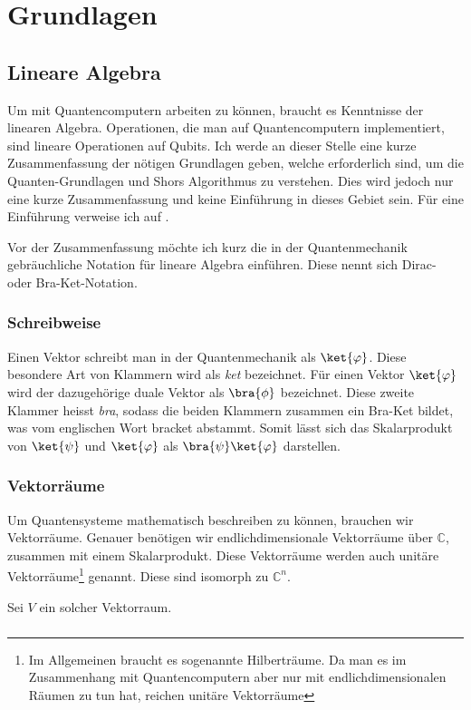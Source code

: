 \chapter{Grundlagen}
\section{Lineare Algebra}
Um mit Quantencomputern arbeiten zu können, braucht es Kenntnisse der linearen Algebra. Operationen, die man auf Quantencomputern implementiert, sind lineare Operationen auf Qubits. Ich werde an dieser Stelle eine kurze Zusammenfassung der nötigen Grundlagen geben, welche erforderlich sind, um die Quanten-Grundlagen und Shors Algorithmus zu verstehen. Dies wird jedoch nur eine kurze Zusammenfassung und keine Einführung in dieses Gebiet sein. Für eine Einführung verweise ich auf \cite{LA}.

Vor der Zusammenfassung möchte ich kurz die in der Quantenmechanik gebräuchliche Notation für lineare Algebra einführen. Diese nennt sich Dirac- oder Bra-Ket-Notation. 

\subsection{Schreibweise}
Einen Vektor schreibt man in der Quantenmechanik als $\ket{\varphi}$. Diese besondere Art von Klammern wird als \textit{ket} bezeichnet. Für einen Vektor $\ket{\varphi}$ wird der dazugehörige duale Vektor als $\bra{\phi}$ bezeichnet. Diese zweite Klammer heisst \textit{bra}, sodass die beiden Klammern zusammen ein Bra-Ket bildet, was vom englischen Wort bracket abstammt. Somit lässt sich das Skalarprodukt von $\ket{\psi}$ und $\ket{\varphi}$ als $\bra{\psi}\ket{\varphi}$ darstellen.

\subsection{Vektorräume}
Um Quantensysteme mathematisch beschreiben zu können, brauchen wir Vektorräume. Genauer benötigen wir endlichdimensionale Vektorräume über $\mathbb{C}$, zusammen mit einem Skalarprodukt. Diese Vektorräume werden auch unitäre Vektorräume\footnote{Im Allgemeinen braucht es sogenannte Hilberträume. Da man es im Zusammenhang mit Quantencomputern aber nur mit endlichdimensionalen Räumen zu tun hat, reichen unitäre Vektorräume} genannt. Diese sind isomorph zu $\mathbb{C}^n$.

Sei $V$ ein solcher Vektorraum. 
\paragraph{}

